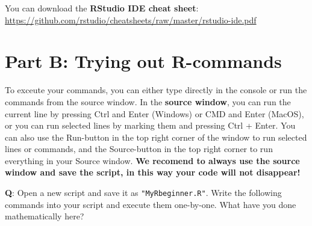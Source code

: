 \documentclass[]{article}
\begin{document}
You can download the \textbf{RStudio IDE cheat sheet}:
\url{https://github.com/rstudio/cheatsheets/raw/master/rstudio-ide.pdf}

\section{Part B: Trying out
R-commands}\label{part-b-trying-out-r-commands}

To exceute your commands, you can either type directly in the console or
run the commands from the source window. In the \textbf{source window},
you can run the current line by pressing Ctrl and Enter (Windows) or CMD
and Enter (MacOS), or you can run selected lines by marking them and
pressing Ctrl + Enter. You can also use the Run-button in the top right
corner of the window to run selected lines or commands, and the
Source-button in the top right corner to run everything in your Source
window. \textbf{We recomend to always use the source window and save the
script, in this way your code will not disappear!}

\textbf{Q}: Open a new script and save it as \texttt{"MyRbeginner.R"}.
Write the following commands into your script and execute them
one-by-one. What have you done mathematically here?
\end{document}
